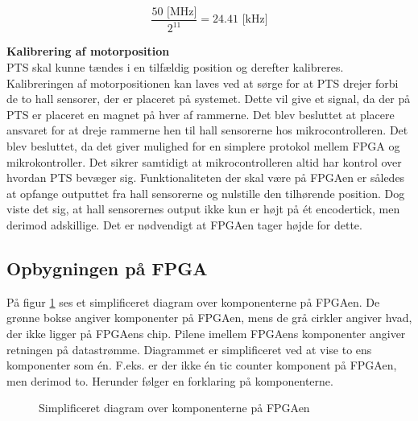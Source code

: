 \begin{equation}
  \frac{50 \text{ [MHz]}}{2^{11}} = 24.41 \text{ [kHz]}
\end{equation}

\textbf{Kalibrering af motorposition}\\
PTS skal kunne tændes i en tilfældig position og derefter kalibreres.
Kalibreringen af motorpositionen kan laves ved at sørge for at PTS drejer forbi 
de to hall sensorer, der er placeret på systemet. Dette vil give et signal, da 
der på PTS er placeret en magnet på hver af rammerne.
Det blev besluttet at placere ansvaret for at dreje rammerne hen til hall 
sensorerne hos mikrocontrolleren. Det blev besluttet, da det giver mulighed for 
en simplere protokol mellem FPGA og mikrokontroller. Det sikrer samtidigt at mikrocontrolleren 
altid har kontrol over hvordan PTS bevæger sig.
Funktionaliteten der skal være på FPGAen er således at opfange outputtet fra 
hall sensorerne og nulstille den tilhørende position.
Dog viste det sig, at hall sensorernes output ikke kun er højt på ét encodertick, 
men derimod adskillige. Det er nødvendigt at FPGAen tager højde for 
dette.

\subsection{Opbygningen på FPGA}
På figur \ref{fig:FPGA_blok} ses et simplificeret diagram over komponenterne på FPGAen. 
De grønne bokse angiver komponenter på FPGAen, mens de grå cirkler angiver hvad, der ikke ligger på 
FPGAens chip. Pilene imellem FPGAens komponenter angiver retningen på 
datastrømme. Diagrammet er simplificeret ved at vise to ens komponenter som én. 
F.eks. er der ikke én tic counter komponent på FPGAen, men derimod to.
Herunder følger en forklaring på komponenterne.

\begin{figure}[!th]
\centering
\begin{tikzpicture}[node distance = 5 cm,scale=1]

\end{tikzpicture}
\caption[Diagram over FPGA komponenter]{Simplificeret diagram over komponenterne på FPGAen}
\label{fig:FPGA_blok}
\end{figure}


